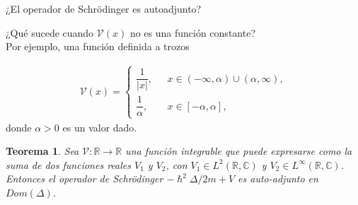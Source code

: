 \documentclass[aspectratio=1610]{beamer}
\newcommand*{\field}[1]{\mathbb{#1}}
\newtheorem*{teo}{Teorema}
\begin{document}
\begin{frame}{¿El operador de Schrödinger es autoadjunto?}

¿Qué sucede cuando $\mathcal{V}(x)$ no es una función constante? \\
\vspace{0.04\textheight}
Por ejemplo, una función definida a trozos

\begin{align*}
        \mathcal{V}(x) = 
        \left\{ \begin{array}{ll}
        \dfrac{1}{|x|},& \:\:\:  x \in (-\infty,\alpha)\cup (\alpha,\infty),
        \\
        \dfrac{1}{\alpha},& \:\:\: x \in [-\alpha,\alpha],
        \end{array}
        \right.
    \end{align*}
donde $\alpha>0$ es un valor dado.

\vspace{0.04\textheight}

\begin{teo}
    Sea $\mathcal{V}:\field{R}\longrightarrow\field{R}$ una función integrable que puede expresarse como la suma de dos funciones reales $V_{1}$ y $V_{2}$, con $V_{1}\in L^{2}(\field{R},\field{C})$ y $V_{2}\in L^{\infty}(\field{R},\field{C})$. Entonces el operador de Schrödinger $-\hslash^2 \Delta/2m + V$ es auto-adjunto en $Dom(\Delta)$.
    \label{teo:SCOperator}
\end{teo}

\vspace{0.04\textheight}
\end{frame}
\end{document}
